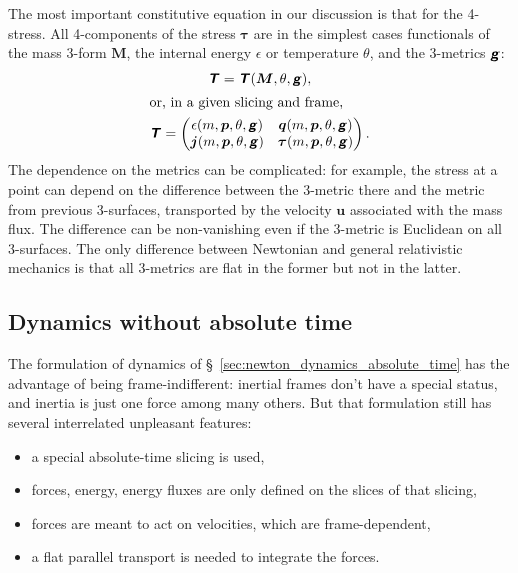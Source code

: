 \documentclass[\ifafour a4paper,12pt,\else a5paper,10pt,\fi%
onecolumn,oneside,article,%
british%
]{memoir}
\theoremstyle{remark}
\theoremstyle{innote}
\newcommand*{\mathte}[1]{\textbf{\textit{\textsf{#1}}}}
\newcommand*{\citep}{\parencites}
\renewcommand*{\|}{\nonscript\,\vert\nonscript\;\mathopen{}}
\newcommand*{\sect}{\S}%
\newcommand*{\ydd}{m}
\newcommand*{\yd}{\ydd}
\newcommand*{\yrr}{M}
\newcommand*{\yr}{\bm{\yrr}}
\newcommand*{\ycc}{u}
\newcommand*{\yc}{\bm{\ycc}}
\newcommand*{\yjj}{p}
\newcommand*{\yj}{\bm{\yjj}}
\newcommand*{\yqq}{q}
\newcommand*{\yq}{\bm{\yqq}}
\newcommand*{\yTT}{\tau}
\newcommand*{\yT}{\bm{\yTT}}
\newcommand*{\yTTf}{T}
\newcommand*{\yTf}{\mathte{\yTTf}}
\newcommand*{\ygg}{g}
\newcommand*{\yg}{\mathte{\ygg}}
\newcommand*{\ypp}{j}
\newcommand*{\yp}{\bm{\ypp}}
\newcommand*{\ye}{\epsilon}
\newcommand*{\yte}{\theta}
\begin{document}
The most important constitutive equation in our discussion is that for the
4-stress. All 4-components of the stress $\yT$ are in the simplest cases
functionals of the mass 3-form $\yr$, the internal energy $\ye$ or
temperature $\yte$, and the 3-metrics $\yg$:
\begin{subequations}\label{eq:constitutive_4stress}
  \begin{gather}
    \label{eq:constit_T_with_mass_geometry}
    \yTf=\yTf(\yr,\yte,\yg),
    \\
    \shortintertext{or, in a given slicing and frame,}
    \label{eq:4stress_components}
    \yTf =
    \begin{pmatrix}
      \ye(\yd,\yj,\yte,\yg) & \yq(\yd,\yj,\yte,\yg) \\
      \yp(\yd,\yj,\yte,\yg) & \yT(\yd,\yj,\yte,\yg)
    \end{pmatrix}.
  \end{gather}
\end{subequations}
The dependence on the metrics can be complicated: for example, the stress
at a point can depend on the difference between the 3-metric there and the
metric from previous 3-surfaces, transported by the velocity $\yc$
associated with the mass flux\citep{grotetal1966,carteretal1972}. The
difference can be non-vanishing even if the 3-metric is Euclidean on all
3-surfaces. The only difference between Newtonian and general relativistic
mechanics is that all 3-metrics are flat in the former but not in the
latter.


\subsection{Dynamics without absolute time}
\label{sec:newton_dynamics_without_absolute_time}

The formulation of dynamics of
\sect~\ref{sec:newton_dynamics_absolute_time} has the advantage of being
frame-indifferent: inertial frames don't have a special status, and inertia
is just one force among many others. But that formulation still has several
interrelated unpleasant features:
\begin{itemize}
\item a special absolute-time slicing is used,
\item forces, energy, energy fluxes are only defined on the slices of that
  slicing,
\item forces are meant to act on velocities, which are frame-dependent,
\item a flat parallel transport is needed to integrate the forces.
\end{itemize}
\end{document}
